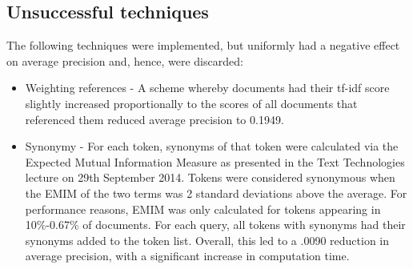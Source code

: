 \documentclass{article}
\begin{document}
\subsection{Unsuccessful techniques}
The following techniques were implemented, but uniformly had a negative effect on average precision and, hence, were discarded:
\begin{itemize}
\item Weighting references - A scheme whereby documents had their tf-idf score slightly increased   proportionally to the scores of all documents that referenced them reduced average precision to 0.1949.
\item Synonymy - For each token, synonyms of that token were calculated via the Expected Mutual Information Measure as presented in the Text Technologies lecture on 29th September 2014. Tokens were considered synonymous when the EMIM of the two terms was 2 standard deviations above the average. For performance reasons, EMIM was only calculated for tokens appearing in 10\%-0.67\% of documents. For each query, all tokens with synonyms had their synonyms added to the token list. Overall, this led to a .0090 reduction in average precision, with a significant increase in computation time.
\end{itemize}
\end{document}
